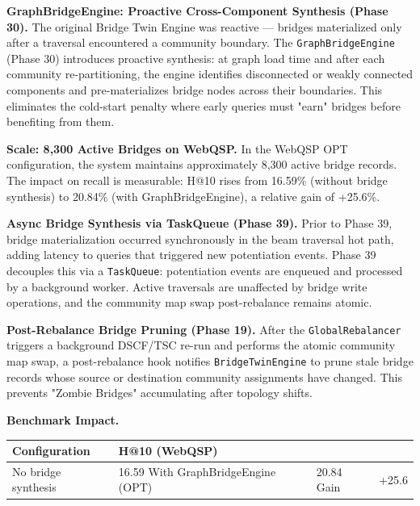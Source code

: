 \textbf{GraphBridgeEngine: Proactive Cross-Component Synthesis (Phase 30).} The original Bridge Twin Engine was reactive --- bridges materialized only after a traversal encountered a community boundary. The \texttt{GraphBridgeEngine} (Phase 30) introduces proactive synthesis: at graph load time and after each community re-partitioning, the engine identifies disconnected or weakly connected components and pre-materializes bridge nodes across their boundaries. This eliminates the cold-start penalty where early queries must "earn" bridges before benefiting from them.

\textbf{Scale: 8,300 Active Bridges on WebQSP.} In the WebQSP OPT configuration, the system maintains approximately 8,300 active bridge records. The impact on recall is measurable: H@10 rises from 16.59\% (without bridge synthesis) to 20.84\% (with GraphBridgeEngine), a relative gain of +25.6\%.

\textbf{Async Bridge Synthesis via TaskQueue (Phase 39).} Prior to Phase 39, bridge materialization occurred synchronously in the beam traversal hot path, adding latency to queries that triggered new potentiation events. Phase 39 decouples this via a \texttt{TaskQueue}: potentiation events are enqueued and processed by a background worker. Active traversals are unaffected by bridge write operations, and the community map swap post-rebalance remains atomic.

\textbf{Post-Rebalance Bridge Pruning (Phase 19).} After the \texttt{GlobalRebalancer} triggers a background DSCF/TSC re-run and performs the atomic community map swap, a post-rebalance hook notifies \texttt{BridgeTwinEngine} to prune stale bridge records whose source or destination community assignments have changed. This prevents "Zombie Bridges" accumulating after topology shifts.

\textbf{Benchmark Impact.}

\begin{table}[h]
\small\centering
\begin{tabular}{ll}
\toprule
Configuration & H@10 (WebQSP) \\
\midrule
No bridge synthesis & 16.59%
With GraphBridgeEngine (OPT) & 20.84%
Gain & +25.6%
\bottomrule
\end{tabular}
\end{table}
